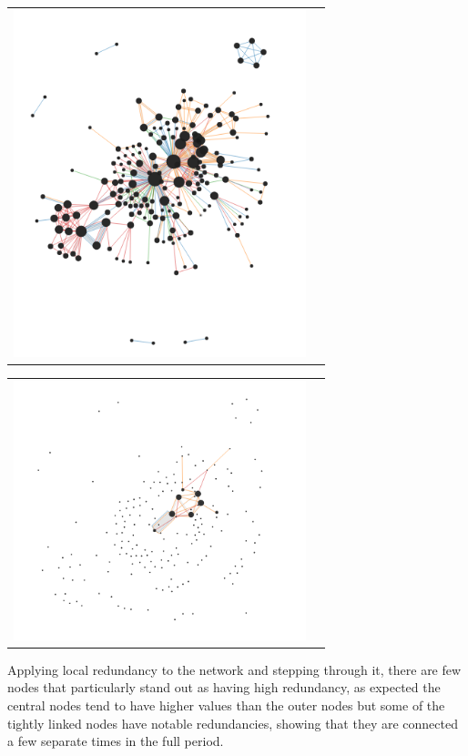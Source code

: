 \begin{center}
\begin{tabular}{cc}
\label{marieBoucherLocalCentralityFull}
\includegraphics[trim={0 0 0 0}, width=85mm]{./Figures/marieBoucherLocalCentralityFull.png}
\end{tabular}
\end{center}   


\begin{center}
\begin{tabular}{cc}
\label{marieBoucherLocalRedundancyPeriod1}
\includegraphics[trim={0 0 0 0}, width=85mm]{./Figures/marieBoucherLocalRedundancyPeriod1.png}
\end{tabular}
\end{center}   
Applying local redundancy to the network and stepping through it, there are few nodes that particularly stand out as having high redundancy, as expected the central nodes tend to have higher values than the outer nodes but some of the tightly linked nodes have notable redundancies, showing that they are connected a few separate times in the full period.

